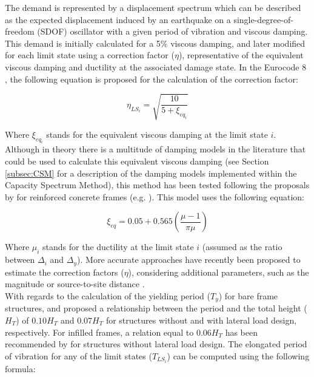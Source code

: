 The demand is represented by a displacement spectrum which can be described as the expected displacement induced by an earthquake on a single-degree-of-freedom (SDOF) oscillator with a given period of vibration and viscous damping. This demand is initially calculated for a 5\% viscous damping, and later modified for each limit state using a correction factor ($\eta$), representative of the equivalent viscous damping and ductility at the associated damage state. In the Eurocode 8 \citep{CEN2005}, the following equation is proposed for the calculation of the correction factor:

\begin{equation}
\eta_{LS_i} = \sqrt{\frac{10}{5+\xi_{eq_i}}}
\end{equation}

Where $\xi_{eq_i}$ stands for the equivalent viscous damping at the limit state $i$. Although in theory there is a multitude of damping models in the literature that could be used to calculate this equivalent viscous damping (see Section \ref{subsec:CSM} for a description of the damping models implemented within the Capacity Spectrum Method), this method has been tested following the proposals by \cite{PriestleyEtAl2007} for reinforced concrete frames (e.g. \cite{BalEtAl2010} \cite{SilvaEtAl2013}). This model uses the following equation: 

\begin{equation}
\xi_{eq} = 0.05 + 0.565\left(\frac{\mu-1}{\pi\mu}\right)
\end{equation}

Where $\mu_i$ stands for the ductility at the limit state $i$ (assumed as the ratio between $\Delta_i$ and $\Delta_y$). More accurate approaches have recently been proposed to estimate the correction factors ($\eta$), considering additional parameters, such as the magnitude or source-to-site distance \citep{RezaeianEtAl2012}.\\

With regards to the calculation of the yielding period ($T_y$) for bare frame structures, \cite{CrowleyPinho2004} and \cite{CrowleyEtAl2008} proposed a relationship between the period and the total height ($H_T$) of $0.10H_T$ and $0.07H_T$ for structures without and with lateral load design, respectively. For infilled frames, a relation equal to $0.06H_T$ has been recommended by \cite{CrowleyPinho2006} for structures without lateral load design. The elongated period of vibration for any of the limit states ($T_{LS_i}$) can be computed using the following formula:

